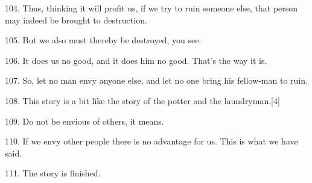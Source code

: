 {\LARGE{}104. Thus, thinking it will profit us, if we try to ruin someone else,
that person may indeed be brought to destruction. }

{\LARGE{}105. But we also must thereby be destroyed, you see.}

{\LARGE{}106. It does us no good, and it does him no good. That's the way it is.}

{\LARGE{}107. So, let no man envy anyone else, and let no one bring his fellow-man
to ruin. }

{\LARGE{}108. This story is a bit like the story of the potter and the laundryman.[4]
}

{\LARGE{}109. Do not be envious of others, it means.}

{\LARGE{}110. If we envy other people there is no advantage for us. This is what
we have said. }

{\LARGE{}111. The story is finished. }

